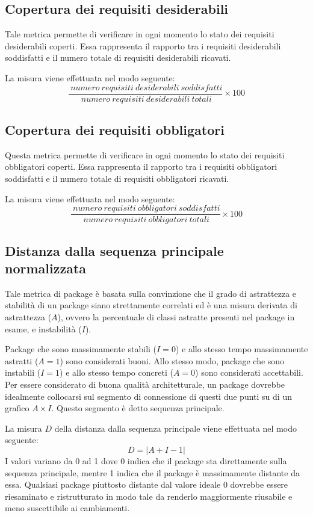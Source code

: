 \subsection{Copertura dei requisiti desiderabili}
Tale metrica permette di verificare in ogni momento lo stato dei requisiti desiderabili coperti. Essa rappresenta il rapporto tra i requisiti desiderabili soddisfatti e il numero totale di requisiti desiderabili ricavati.

La misura viene effettuata nel modo seguente:
\begin{equation}
	\frac{~numero~requisiti~desiderabili~soddisfatti}{~numero~requisiti~desiderabili~totali}\times{100}
\end{equation}


\subsection{Copertura dei requisiti obbligatori}
Questa metrica permette di verificare in ogni momento lo stato dei requisiti obbligatori coperti. Essa rappresenta il rapporto tra i requisiti obbligatori soddisfatti e il numero totale di requisiti obbligatori ricavati.

La misura viene effettuata nel modo seguente:
\begin{equation}
	\frac{~numero~requisiti~obbligatori~soddisfatti}{~numero~requisiti~obbligatori~totali}\times{100}
\end{equation}


\subsection{Distanza dalla sequenza principale normalizzata} 
Tale metrica di package è basata sulla convinzione che il grado di astrattezza e stabilità di un package siano strettamente correlati ed è una misura derivata di astrattezza ($A$), ovvero la percentuale di classi astratte presenti nel package in esame, e instabilità ($I$). 

Package che sono massimamente stabili ($I = 0$) e allo stesso tempo massimamente astratti ($A = 1$) sono considerati buoni. Allo stesso modo, package che sono instabili ($I = 1$) e allo stesso tempo concreti ($A = 0$) sono considerati accettabili. Per essere considerato di buona qualità architetturale, un package dovrebbe idealmente collocarsi sul segmento di connessione di questi due punti su di un grafico $A \times I$. Questo segmento è detto sequenza principale.

La misura $D$ della distanza dalla sequenza principale viene effettuata nel modo seguente:
\begin{equation}
	D = | A + I - 1 | 
\end{equation}
I valori variano da 0 ad 1 dove 0 indica che il package sta direttamente sulla sequenza principale, mentre 1 indica che il package è massimamente distante da essa. Qualsiasi package piuttosto distante dal valore ideale 0 dovrebbe essere riesaminato e ristrutturato in modo tale da renderlo maggiormente riusabile e meno suscettibile ai cambiamenti.


